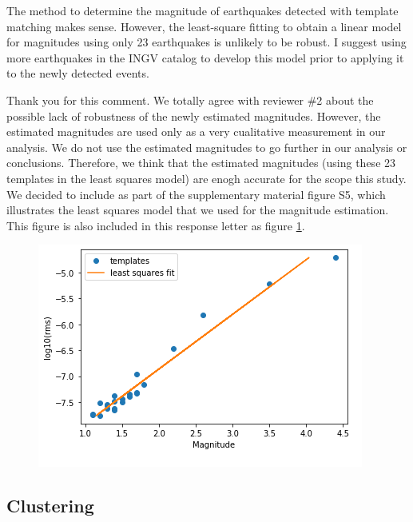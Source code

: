 \documentclass[10pt]{extarticle}
\begin{document}
\begin{ReviewerComment}{2}
\noindent 
The method to determine the magnitude of earthquakes detected with template matching makes sense. However, the least-square fitting to obtain a linear model for magnitudes using only 23 earthquakes is unlikely to be robust. I suggest using more earthquakes in the INGV catalog to develop this model prior to applying it to the newly detected events.

\end{ReviewerComment}


\begin{Answer}
Thank you for this comment. We totally agree with reviewer \#2 about the possible lack of robustness of the newly estimated magnitudes. However, the estimated magnitudes are used only as a very cualitative measurement in our analysis. We do not use the estimated magnitudes to go further in our analysis or conclusions. Therefore, we think that the estimated magnitudes (using these 23 templates in the least squares model) are enogh accurate for the scope this study. We decided to include as part of the supplementary material figure S5, which illustrates the least squares model that we used for the magnitude estimation. This figure is also included in this response letter as figure \ref{fig:S5_lsq_model}.
\begin{figure}[!h]
\begin{center}
 \includegraphics[width=0.7\linewidth]{S5_lsq_model.png} 
\end{center}
\label{fig:S5_lsq_model}
\end{figure}
 \WorkInProgressRevTask
\end{Answer}
%
%

\subsection*{Clustering}
\end{document}
